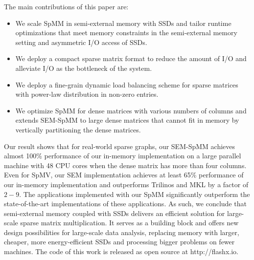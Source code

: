 The main contributions of this paper are:
\begin{itemize}
	\item We scale SpMM in semi-external memory with SSDs and tailor runtime
		optimizations that meet memory constraints in the semi-external memory
		setting and asymmetric I/O access of SSDs.
	\item We deploy a compact sparse matrix format to reduce the amount of
		I/O and alleviate I/O as the bottleneck of the system.
	\item We deploy a fine-grain dynamic load balancing scheme for sparse
		matrices with power-law distribution in non-zero entries.
	\item We optimize SpMM for dense matrices with various numbers of columns
		and extends SEM-SpMM to large dense matrices that cannot fit in memory
		by vertically partitioning the dense matrices.
\end{itemize}

Our result shows that for real-world sparse graphs, our SEM-SpMM achieves almost
100\% performance of our in-memory implementation on a large parallel machine
with 48 CPU cores when the dense matrix has more than four columns. Even for
SpMV, our SEM implementation achieves at least 65\% performance of our in-memory
implementation and outperforms Trilinos \cite{trilinos} and MKL \cite{mkl} by
a factor of $2-9$. The applications implemented with our SpMM significantly
outperform the state-of-the-art implementations of these applications. As such,
we conclude that semi-external memory coupled with SSDs delivers an efficient
solution for large-scale sparse matrix multiplication. It serves
as a building block and offers new design possibilities for large-scale
data analysis, replacing memory with larger, cheaper, more energy-efficient SSDs
and processing bigger problems on fewer machines. The code of this work is
released as open source at http://flashx.io.
